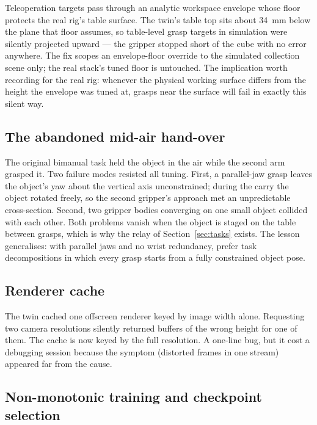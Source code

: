 Teleoperation targets pass through an analytic workspace envelope whose
floor protects the real rig's table surface. The twin's table top sits
about \SI{34}{\milli\metre} below the plane that floor assumes, so
table-level grasp targets in simulation were silently projected upward
--- the gripper stopped short of the cube with no error anywhere. The
fix scopes an envelope-floor override to the simulated collection scene
only; the real stack's tuned floor is untouched. The implication worth
recording for the real rig: whenever the physical working surface
differs from the height the envelope was tuned at, grasps near the
surface will fail in exactly this silent way.

\subsection{The abandoned mid-air hand-over}
\label{sec:diff-handover}

The original bimanual task held the object in the air while the second
arm grasped it. Two failure modes resisted all tuning. First, a
parallel-jaw grasp leaves the object's yaw about the vertical axis
unconstrained; during the carry the object rotated freely, so the
second gripper's approach met an unpredictable cross-section. Second,
two gripper bodies converging on one small object collided with each
other. Both problems vanish when the object is staged on the table
between grasps, which is why the relay of Section~\ref{sec:tasks}
exists. The lesson generalises: with parallel jaws and no wrist
redundancy, prefer task decompositions in which every grasp starts from
a fully constrained object pose.

\subsection{Renderer cache}
\label{sec:diff-renderer}

The twin cached one offscreen renderer keyed by image width alone.
Requesting two camera resolutions silently returned buffers of the
wrong height for one of them. The cache is now keyed by the full
resolution. A one-line bug, but it cost a debugging session because the
symptom (distorted frames in one stream) appeared far from the cause.

\subsection{Non-monotonic training and checkpoint selection}
\label{sec:diff-checkpoint}

